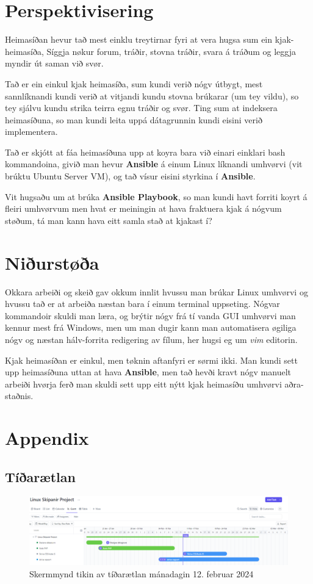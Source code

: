 \documentclass{article}
\begin{document}
\section{Perspektivisering}
\par Heimasíðan hevur tað mest einklu treytirnar fyri at vera hugsa sum ein kjak-heimasíða,
Síggja nøkur forum, tráðir, stovna tráðir, svara á tráðum og leggja myndir út saman við svør.
\par Tað er ein einkul kjak heimasíða, sum kundi verið nógv útbygt, mest sannlíknandi
kundi verið at vitjandi kundu stovna brúkarar (um tey vildu), so tey sjálvu kundu strika
teirra egnu tráðir og svør. Ting sum at indeksera heimasíðuna, so man kundi leita uppá
dátagrunnin kundi eisini verið implementera.
\par Tað er skjótt at fáa heimasíðuna upp at koyra bara við einari einklari bash kommandoina,
givið man hevur \textbf{Ansible} á einum
Linux líknandi umhvørvi (vit brúktu Ubuntu Server VM), og tað vísur eisini styrkina í \textbf{Ansible}.
\par Vit hugsaðu um at brúka \textbf{Ansible Playbook}, so man kundi havt forriti koyrt á 
fleiri umhvørvum men hvat er meiningin at hava fraktuera kjak á nógvum støðum, tá man kann hava
eitt samla stað at kjakast í?

\section{Niðurstøða}
\par Okkara arbeiði og skeið gav okkum innlit hvussu man brúkar Linux umhvørvi og hvussu tað
er at arbeiða næstan bara í einum terminal uppseting. Nógvar kommandoir skuldi man læra, og
brýtir nógv frá tí vanda GUI umhvørvi man kennur mest frá Windows, men um man dugir kann man
automatisera øgiliga nógv og næstan hálv-forrita redigering av fílum, her hugsi eg um \textit{vim}
editorin.
\par Kjak heimasíðan er einkul, men tøknin aftanfyri er sørmi ikki. Man kundi sett upp heimasíðuna
uttan at hava \textbf{Ansible}, men tað hevði kravt nógv manuelt arbeiði hvørja ferð man skuldi
sett upp eitt nýtt kjak heimasíðu umhvørvi aðra-staðnis.

\section{Appendix}

\subsection{Tíðarætlan}
\begin{figure}[H]
    \includegraphics[width=\linewidth]{tíðarætlan.png}
    \caption{Skermmynd tikin av tíðarætlan mánadagin 12. februar 2024}
    \label{fig:tíðarætlan.png}
\end{figure}
\end{document}
